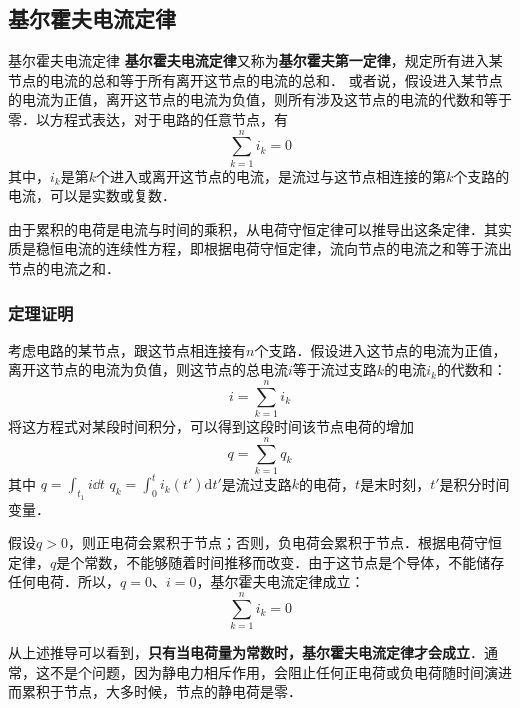 
\subsection{基尔霍夫电流定律}

\begin{theorem}{基尔霍夫电流定律}
\textbf{基尔霍夫电流定律}又称为\textbf{基尔霍夫第一定律}，规定所有进入某节点的电流的总和等于所有离开这节点的电流的总和． 或者说，假设进入某节点的电流为正值，离开这节点的电流为负值，则所有涉及这节点的电流的代数和等于零．以方程式表达，对于电路的任意节点，有
\begin{equation}
\sum_{k=1}^n i_k =0
\end{equation}
其中，$i_k$是第$k$个进入或离开这节点的电流，是流过与这节点相连接的第$k$个支路的电流，可以是实数或复数．
\end{theorem}

由于累积的电荷是电流与时间的乘积，从电荷守恒定律可以推导出这条定律．其实质是稳恒电流的连续性方程，即根据电荷守恒定律，流向节点的电流之和等于流出节点的电流之和．

\subsubsection{定理证明}
考虑电路的某节点，跟这节点相连接有$n$个支路．假设进入这节点的电流为正值，离开这节点的电流为负值，则这节点的总电流$i$等于流过支路$k$的电流$i_k$的代数和：
\begin{equation}
i=\sum_{k=1}^n i_k
\end{equation}
将这方程式对某段时间积分，可以得到这段时间该节点电荷的增加
\begin{equation}
q=\sum_{k=1}^n q_k
\end{equation}
其中 $q = \int_{t_1} i \dd{t}$ $q_k=\int_0^t i_k(t') \mathrm{d}t'$是流过支路$k$的电荷，$t$是末时刻，$t'$是积分时间变量．

假设$q>0$，则正电荷会累积于节点；否则，负电荷会累积于节点．根据电荷守恒定律，$q$是个常数，不能够随着时间推移而改变．由于这节点是个导体，不能储存任何电荷．所以，$q=0$、$i=0$，基尔霍夫电流定律成立：
\begin{equation}
\sum_{k=1}^n i_k =0
\end{equation}

从上述推导可以看到，\textbf{只有当电荷量为常数时，基尔霍夫电流定律才会成立}．通常，这不是个问题，因为静电力相斥作用，会阻止任何正电荷或负电荷随时间演进而累积于节点，大多时候，节点的静电荷是零．


